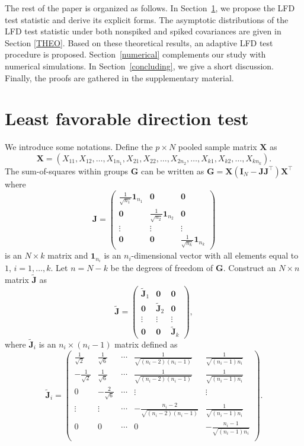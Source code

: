 \documentclass[12pt]{article} %
\newcommand{\bX}{\mathbf{X}}
\newcommand{\bG}{\mathbf{G}}
\newcommand{\bJ}{\mathbf{J}}
\newcommand{\bI}{\mathbf{I}}
\theoremstyle{definition}
\begin{document}
    The rest of the paper is organized  as follows.
    In Section~\ref{methodology}, we propose the LFD test statistic and derive its explicit forms.
    The asymptotic distributions of the LFD test statistic under both nonspiked and spiked covariances are given in Section \ref{THEO}.
    Based on these theoretical results, an adaptive LFD test procedure is proposed.
     Section~\ref{numerical} complements our study with numerical simulations.
     In Section~\ref{concluding}, we give a short discussion.
     Finally, the proofs are gathered in the supplementary material.





 
\section{Least favorable direction test}\label{methodology}
\setcounter{equation}{0} %
We introduce some notations.
 Define the $p\times N$ pooled sample matrix $\bX$ as
 $$\bX=(X_{11},X_{12},\ldots,X_{1n_1},X_{21},X_{22},\ldots,X_{2n_2},\ldots,X_{k1},X_{k2},\ldots,X_{kn_k}).$$
 The sum-of-squares within groups $\bG$ can be written as $\bG=\bX(\bI_N-\bJ\bJ^\top)\bX^\top$ where
 $$
 \bJ=\begin{pmatrix}
     \frac{1}{\sqrt{n_1}}\mathbf{1}_{n_1}&\mathbf{0} & \mathbf{0}\\
     \mathbf{0}&\frac{1}{\sqrt{n_2}} \mathbf{1}_{n_2}& \mathbf{0}\\
     \vdots &\vdots &\vdots \\
     \mathbf{0}&\mathbf{0}&\frac{1}{\sqrt{n_k}}\mathbf{1}_{n_k}
 \end{pmatrix}
 $$
 is an $N\times k$ matrix
 and $\mathbf{1}_{n_i}$ is an $n_i$-dimensional vector with all elements equal to $1$, $i=1,\ldots, k$.
 Let $n=N-k$ be the degrees of freedom of $\bG$.
 Construct an $N\times n$ matrix $\tilde{\bJ}$ as 
 $$
 \tilde{\bJ}=\begin{pmatrix}
     \tilde{\bJ}_1&\mathbf{0} & \mathbf{0}\\
     \mathbf{0}&\tilde{\bJ}_2& \mathbf{0}\\
     \vdots &\vdots &\vdots \\
     \mathbf{0}&\mathbf{0}&\tilde{\bJ}_k
 \end{pmatrix},
 $$
 where $\tilde{\bJ}_i$ is an $n_i\times (n_{i}-1)$ matrix defined as
 $$
\tilde{\bJ}_i=\begin{pmatrix}
    \frac{1}{\sqrt{2}}&\frac{1}{\sqrt{6}}&\cdots&\frac{1}{\sqrt{(n_i-2)(n_i-1)}}&\frac{1}{\sqrt{(n_i-1)n_i}}\\
    -\frac{1}{\sqrt{2}}&\frac{1}{\sqrt{6}}&\cdots&\frac{1}{\sqrt{(n_i-2)(n_i-1)}}&\frac{1}{\sqrt{(n_i-1)n_i}}\\
    0&-\frac{2}{\sqrt{6}}&\cdots&\vdots&\vdots\\
    \vdots&\vdots&\cdots&-\frac{n_i-2}{\sqrt{(n_i-2)(n_i-1)}}&\frac{1}{\sqrt{(n_i-1)n_i}}\\
    0&0&\cdots&0&-\frac{n_i-1}{\sqrt{(n_i-1)n_i}}\\
\end{pmatrix}.
 $$
\end{document}
